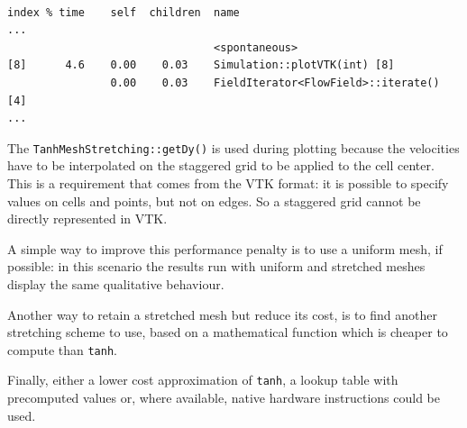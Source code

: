 \documentclass[11pt,a4paper,DIV12,pdftex]{scrartcl}
\begin{document}
\begin{lstlisting}

index % time    self  children  name
...
                                <spontaneous>
[8]      4.6    0.00    0.03    Simulation::plotVTK(int) [8]
                0.00    0.03    FieldIterator<FlowField>::iterate() [4]
...
\end{lstlisting}

The \verb!TanhMeshStretching::getDy()! is used during plotting because the velocities have to be interpolated on the staggered grid to be applied to the cell center. This is a requirement that comes from the VTK format: it is possible to specify values on cells and points, but not on edges. So a staggered grid cannot be directly represented in VTK.

A simple way to improve this performance penalty is to use a uniform mesh, if possible: in this scenario the results run with uniform and stretched meshes display the same qualitative behaviour.

Another way to retain a stretched mesh but reduce its cost, is to find another stretching scheme to use, based on a mathematical function which is cheaper to compute than \verb!tanh!.

Finally, either a lower cost approximation of \verb!tanh!, a lookup table with precomputed values or, where available, native hardware instructions could be used.

% 
% 
\end{document}
